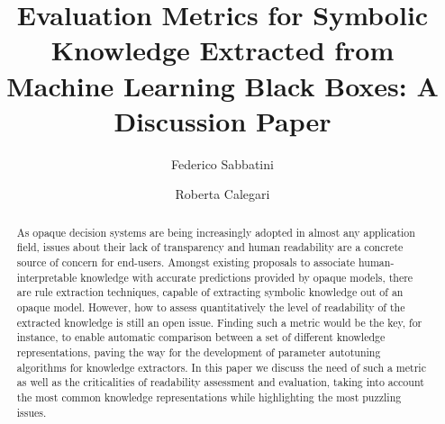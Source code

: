 \documentclass[sigconf]{acmart}
\begin{document}
\title{Evaluation Metrics for Symbolic Knowledge Extracted from Machine Learning Black Boxes: A Discussion Paper}

\author{Federico Sabbatini}

\author{Roberta Calegari}

\renewcommand{\shortauthors}{F. Sabbatini, R. Calegari}

\begin{abstract}
  As opaque decision systems are being increasingly adopted in almost any application field, issues about their lack of transparency and human readability are a concrete source of concern for end-users.
  Amongst existing proposals to associate human-interpretable knowledge with accurate predictions provided by opaque models, there are rule extraction techniques, capable of extracting symbolic knowledge out of an opaque model.
  However, how to assess quantitatively the level of readability of the extracted knowledge is still an open issue.
  Finding such a metric would be the key, for instance, to enable automatic comparison between a set of different knowledge representations, paving the way for the development of parameter autotuning algorithms for knowledge extractors.
  In this paper we discuss the need of such a metric as well as the criticalities of readability assessment and evaluation, taking into account the most common knowledge representations while highlighting the most puzzling issues.
\end{abstract}
\end{document}
